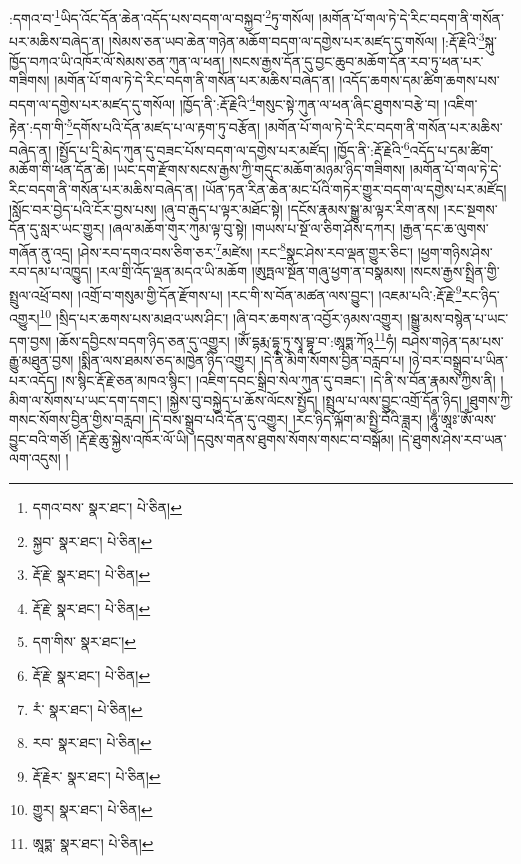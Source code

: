 :དགའ་བ་\footnote{དགའ་བས་  སྣར་ཐང་།  པེ་ཅིན། }ཡིད་འོང་དོན་ཆེན་འདོད་པས་བདག་ལ་བསྐྱབ་\footnote{སྐྱབ་  སྣར་ཐང་།  པེ་ཅིན། }ཏུ་གསོལ། །མགོན་པོ་གལ་ཏེ་དེ་རིང་བདག་ནི་གསོན་པར་མཆིས་བཞེད་ན། །སེམས་ཅན་ཡབ་ཆེན་གཉེན་མཆོག་བདག་ལ་དགྱེས་པར་མཛད་དུ་གསོལ། །:རྡོ་རྗེའི་\footnote{རྡོ་རྗེ་  སྣར་ཐང་།  པེ་ཅིན། }སྐུ་ཁྱོད་བཀའ་ཡི་འཁོར་ལོ་སེམས་ཅན་ཀུན་ལ་ཕན། །སངས་རྒྱས་དོན་དུ་བྱང་ཆུབ་མཆོག་དོན་རབ་ཏུ་ཕན་པར་གཟིགས། །མགོན་པོ་གལ་ཏེ་དེ་རིང་བདག་ནི་གསོན་པར་མཆིས་བཞེད་ན། །འདོད་ཆགས་དམ་ཚིག་ཆགས་པས་བདག་ལ་དགྱེས་པར་མཛད་དུ་གསོལ། །ཁྱོད་ནི་:རྡོ་རྗེའི་\footnote{རྡོ་རྗེ་  སྣར་ཐང་།  པེ་ཅིན། }གསུང་སྟེ་ཀུན་ལ་ཕན་ཞིང་ཐུགས་བརྩེ་བ། །འཇིག་རྟེན་:དག་གི་\footnote{དག་གིས་  སྣར་ཐང་། }དགོས་པའི་དོན་མཛད་པ་ལ་རྟག་ཏུ་བརྩོན། །མགོན་པོ་གལ་ཏེ་དེ་རིང་བདག་ནི་གསོན་པར་མཆིས་བཞེད་ན། །སྤྱོད་པ་དྲི་མེད་ཀུན་དུ་བཟང་པོས་བདག་ལ་དགྱེས་པར་མཛོད། །ཁྱོད་ནི་:རྡོ་རྗེའི་\footnote{རྡོ་རྗེ་  སྣར་ཐང་།  པེ་ཅིན། }འདོད་པ་དམ་ཚིག་མཆོག་གི་ཕན་དོན་ཆེ། །ཡང་དག་རྫོགས་སངས་རྒྱས་ཀྱི་གདུང་མཆོག་མཉམ་ཉིད་གཟིགས། །མགོན་པོ་གལ་ཏེ་དེ་རིང་བདག་ནི་གསོན་པར་མཆིས་བཞེད་ན། །ཡོན་ཏན་རིན་ཆེན་མང་པོའི་གཏེར་གྱུར་བདག་ལ་དགྱེས་པར་མཛོད། །སློང་བར་བྱེད་པའི་ངོར་བྱས་པས། །ཞུ་བ་རྒུད་པ་ལྟར་མཐོང་སྟེ། །དངོས་རྣམས་སྒྱུ་མ་ལྟར་རིག་ནས། །རང་སྔགས་དོན་དུ་སླར་ཡང་གྱུར། །ཞལ་མཆོག་གུར་ཀུམ་ལྟ་བུ་སྟེ། །གཡས་པ་སྔོ་ལ་ཅིག་ཤོས་དཀར། །རྒྱན་དང་ཆ་ལུགས་གཞོན་ནུ་འདྲ། །ཤེས་རབ་དགའ་བས་ཅིག་ཅར་\footnote{རཾ་  སྣར་ཐང་།  པེ་ཅིན། }མཛེས། །རང་\footnote{རབ་  སྣར་ཐང་།  པེ་ཅིན། }སྣང་ཤེས་རབ་ལྡན་གྱུར་ཅིང་། །ཕྱག་གཉིས་ཤེས་རབ་དམ་པ་འཁྱུད། །རལ་གྲི་འོད་ལྡན་མདའ་ཡི་མཆོག །ཨུཏྤལ་སྔོན་གཞུ་ཕྱག་ན་བསྣམས། །སངས་རྒྱས་སྤྲིན་གྱི་སྤྲུལ་འཕྲོ་བས། །འགྲོ་བ་གསུམ་གྱི་དོན་རྫོགས་པ། །རང་གི་ས་བོན་མཚན་ལས་བྱུང་། །འཇམ་པའི་:རྡོ་རྗེ་\footnote{རྡོ་རྗེར་  སྣར་ཐང་།  པེ་ཅིན། }རང་ཉིད་འགྱུར།\footnote{གྱུར།  སྣར་ཐང་།  པེ་ཅིན། } །སྲིད་པར་ཆགས་པས་མཐའ་ཡས་ཤིང་། །ཞི་བར་ཆགས་ན་འབྱོར་ཉམས་འགྱུར། །སྒྱུ་མས་བསྙེན་པ་ཡང་དག་བྱས། །ཆོས་དབྱིངས་བདག་ཉིད་ཅན་དུ་འགྱུར། །ཨོཾ་དྷརྨ་དྷཱ་ཏུ་སྭཱ་བྷཱ་བ་:ཨཱཏྨ་ཀོ྅\footnote{ཨཱཏྨ་  སྣར་ཐང་།  པེ་ཅིན། }ཧཾ། བཤེས་གཉེན་དམ་པས་རྒྱུ་མཐུན་བྱས། །སྨིན་ལས་ཐམས་ཅད་མཁྱེན་ཉིད་འགྱུར། །དེ་ནི་མིག་སོགས་བྱིན་བརླབ་པ། །ཉེ་བར་བསྒྲུབ་པ་ཡིན་པར་འདོད། །ས་སྙིང་རྡོ་རྗེ་ཅན་མཁའ་སྙིང་། །འཇིག་དབང་སྒྲིབ་སེལ་ཀུན་དུ་བཟང་། །དེ་ནི་ས་བོན་རྣམས་ཀྱིས་ནི། །མིག་ལ་སོགས་པ་ཡང་དག་དགང་། །སྐྱེས་བུ་བསྐྱེད་པ་ཆོས་ལོངས་སྤྱོད། །སྤྲུལ་པ་ལས་བྱུང་འགྲོ་དོན་ཉིད། །ཐུགས་ཀྱི་གསང་སོགས་བྱིན་གྱིས་བརླབ། །དེ་བས་སྒྲུབ་པའི་དོན་དུ་འགྱུར། །རང་ཉིད་ལྐོག་མ་སྤྱི་བོའི་ཟླར། །ཧཱུྃ་ཨཱཿ་ཨོཾ་ལས་བྱུང་བའི་གཙོ། །རྡོ་རྗེ་ཆུ་སྐྱེས་འཁོར་ལོ་ཡི། །དབུས་གནས་ཐུགས་སོགས་གསང་བ་བསྒོམ། །དེ་ཐུགས་ཤེས་རབ་ཡན་ལག་འདུས། །
